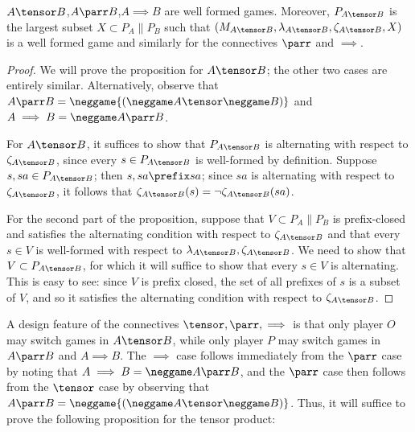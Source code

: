 \documentclass[11pt]{article} %
\begin{document}
\begin{proposition}
  $A\tensor B$,$A\parr B$,$A\implies B$ are well formed games.  Moreover, $P_{A\tensor B}$ is the largest subset $X\subset P_A\|P_B$ such that $(M_{A\tensor B}, \lambda_{A\tensor B}, \zeta_{A\tensor B}, X)$ is a well formed game and similarly for the connectives $\parr$ and $\implies$.  
  \begin{proof}
    We will prove the proposition for $A\tensor B$; the other two cases are entirely similar.  Alternatively, observe that $A\parr B=\neggame{(\neggame A \tensor \neggame B)}$ and $A\implies B = \neggame A \parr B$.

    For $A\tensor B$, it suffices to show that $P_{A\tensor B}$ is alternating with respect to $\zeta_{A\tensor B}$, since every $s\in P_{A\tensor B}$ is well-formed by definition.  Suppose $s,sa\in P_{A\tensor B}$; then $s,sa\prefix sa$; since $sa$ is alternating with respect to $\zeta_{A\tensor B}$, it follows that $\zeta_{A\tensor B}(s) = \neg\zeta_{A\tensor B}(sa)$.

    For the second part of the proposition, suppose that $V\subset P_A\|P_B$ is prefix-closed and satisfies the alternating condition with respect to $\zeta_{A\tensor B}$ and that every $s\in V$ is well-formed with respect to $\lambda_{A\tensor B},\zeta_{A\tensor B}$.  We need to show that $V\subset P_{A\tensor B}$, for which it will suffice to show that every $s\in V$ is alternating.  This is easy to see: since $V$ is prefix closed, the set of all prefixes of $s$ is a subset of $V$, and so it satisfies the alternating condition with respect to $\zeta_{A\tensor B}$.  
  \end{proof}
\end{proposition}

A design feature of the connectives $\tensor,\parr,\implies$ is that only player $O$ may switch games in $A\tensor B$, while only player $P$ may switch games in $A\parr B$ and $A\implies B$.  The $\implies$ case follows immediately from the $\parr$ case by noting that $A\implies B = \neggame A\parr B$, and the $\parr$ case then follows from the $\tensor$ case by observing that $A\parr B=\neggame{(\neggame A \tensor \neggame B)}$.  Thus, it will suffice to prove the following proposition for the tensor product:
\end{document}

